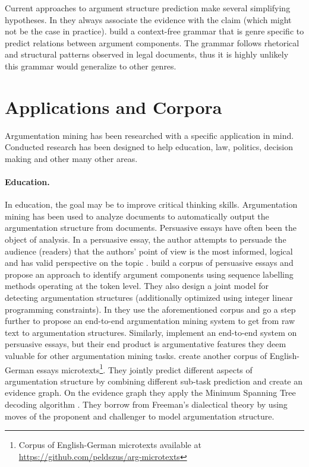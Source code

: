 
Current approaches to argument structure prediction make several simplifying
hypotheses. In \citep{aharoni2014benchmark} they always associate the evidence
with the claim (which might not be the case in practice).
\citet{palau2009argumentation} build a context-free grammar that is genre
specific to predict relations between argument components. The grammar follows
rhetorical and structural patterns observed in legal documents, thus it is
highly unlikely this grammar would generalize to other genres. 

\section{Applications and Corpora}
\label{sec:applications}

Argumentation mining has been researched with a specific application in mind.
Conducted research has been designed to help education, law, politics, decision
making and other many other areas. 

\paragraph{Education.} In education, the goal may be to improve critical
thinking skills.  Argumentation mining has been used to analyze documents to
automatically output the argumentation structure from documents.  Persuasive
essays have often been the object of analysis. In a persuasive essay, the
author attempts to persuade the audience (readers) that the authors' point of
view is the most informed, logical and has valid perspective on the topic
\citep{cabrio2018five}.  \citet{stab2017parsing} build a corpus of persuasive
essays and propose an approach to identify argument components
using sequence labelling methods operating at the token level. They also design
a joint model for detecting argumentation structures (additionally optimized
using integer linear programming constraints). In \citep{eger2017neural} they
use the aforementioned corpus and go a step further to propose an end-to-end
argumentation mining system to get from raw text to argumentation structures.
Similarly, \citet{nguyen2018argument} implement an end-to-end system on
persuasive essays, but their end product is argumentative features they deem
valuable for other argumentation mining tasks. \citet{peldszus2015joint}
create another corpus of English-German essays microtexts\footnote{Corpus of
English-German microtexts available at
\url{https://github.com/peldszus/arg-microtexts}}. They jointly predict
different aspects of argumentation structure by combining different sub-task
prediction and create an evidence graph. On the evidence graph they apply the
Minimum Spanning Tree decoding algorithm \citep{raidl2000weighted}.  They
borrow from Freeman's dialectical theory by using moves of the proponent and
challenger to model argumentation structure.

